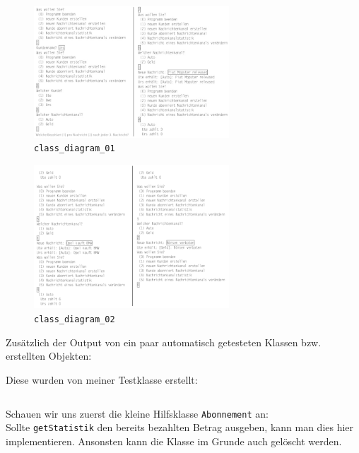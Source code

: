 \documentclass{article}
\begin{document}
\begin{enumerate}[label=\alph*.]
        \begin{figure}[ht]
            \centering
            \includegraphics[width=0.65\textwidth]{class_diagram.jpg}
            \caption{\texttt{class\_diagram\_01}}
        \end{figure}

        \begin{figure}[ht]
            \centering
            \includegraphics[width=0.65\textwidth]{class_diagram.png}
            \caption{\texttt{class\_diagram\_02}}
        \end{figure}

        \newpage

        \newpage
        Zusätzlich der Output von ein paar automatisch getesteten Klassen bzw. erstellten Objekten:


        \newpage
        Diese wurden von meiner Testklasse erstellt:
        \inputminted{java}{Test.java}

        Schauen wir uns zuerst die kleine Hilfsklasse \texttt{Abonnement} an:\\
        Sollte \texttt{getStatistik} den bereits bezahlten Betrag ausgeben, kann man dies hier implementieren.
        Ansonsten kann die Klasse im Grunde auch gelöscht werden.
        \inputminted{java}{Abonnement.java}


\end{enumerate}
\end{document}

